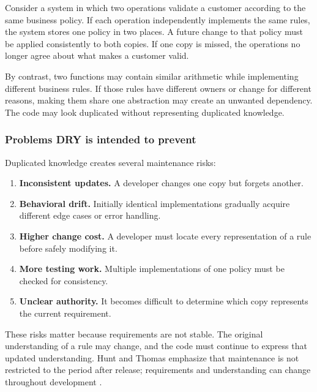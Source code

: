 \documentclass[12pt,a4paper]{article}
\begin{document}
Consider a system in which two operations validate a customer according to the same business policy. If each operation independently implements the same rules, the system stores one policy in two places. A future change to that policy must be applied consistently to both copies. If one copy is missed, the operations no longer agree about what makes a customer valid.

By contrast, two functions may contain similar arithmetic while implementing different business rules. If those rules have different owners or change for different reasons, making them share one abstraction may create an unwanted dependency. The code may look duplicated without representing duplicated knowledge.

\subsubsection{Problems DRY is intended to prevent}

Duplicated knowledge creates several maintenance risks:

\begin{enumerate}

\item \textbf{Inconsistent updates.} A developer changes one copy but forgets another.

\item \textbf{Behavioral drift.} Initially identical implementations gradually acquire different edge cases or error handling.

\item \textbf{Higher change cost.} A developer must locate every representation of a rule before safely modifying it.

\item \textbf{More testing work.} Multiple implementations of one policy must be checked for consistency.

\item \textbf{Unclear authority.} It becomes difficult to determine which copy represents the current requirement.

\end{enumerate}

These risks matter because requirements are not stable. The original understanding of a rule may change, and the code must continue to express that updated understanding. Hunt and Thomas emphasize that maintenance is not restricted to the period after release; requirements and understanding can change throughout development \cite{thomas2019pragmatic}.
\end{document}
